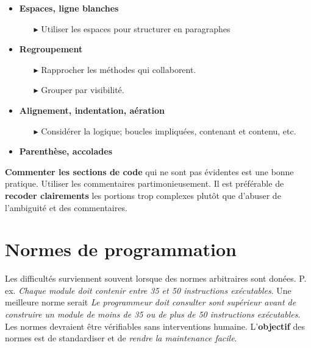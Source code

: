 \documentclass[16pt]{report}
\begin{document}
\begin{multicols*}{2}
    \begin{itemize}
        \item \textbf{Espaces, ligne blanches}  
            \begin{itemize}
                \item[$\blacktriangleright$] Utiliser les espaces pour structurer en paragraphes
            \end{itemize}
        \item \textbf{Regroupement}  
            \begin{itemize}
                \item[$\blacktriangleright$] Rapprocher les méthodes qui collaborent. 
                \item[$\blacktriangleright$] Grouper par visibilité.
            \end{itemize}
        \item \textbf{Alignement, indentation, aération}
            \begin{itemize}
                \item[$\blacktriangleright$] Considérer la logique; boucles impliquées, contenant et contenu, etc.
            \end{itemize}
        \item \textbf{Parenthèse, accolades}
    \end{itemize}


    \begin{note}{}{}
        \textbf{Commenter les sections de code} qui ne sont pas évidentes est une bonne pratique.   
        Utiliser les commentaires partimonieusement. Il est préférable de 
        \textbf{recoder clairements} les portions trop complexes plutôt que d'abuser 
        de l'ambiguité et des commentaires. 
    \end{note}


    \section{Normes de programmation}

    Les difficultés surviennent souvent lorsque des normes arbitraires sont donées. P. ex. 
    \textit{Chaque module doit contenir entre 35 et 50 instructions exécutables}. Une meilleure norme 
    serait \textit{Le programmeur doit consulter sont supérieur avant de construire un module de moins de 
    35 ou de plus de 50 instructions exécutables}. Les normes devraient être vérifiables sans 
    interventions humaine. L'\textbf{objectif} des normes est de standardiser et de 
    \textit{rendre la maintenance facile}.  




\end{multicols*}
\end{document}

